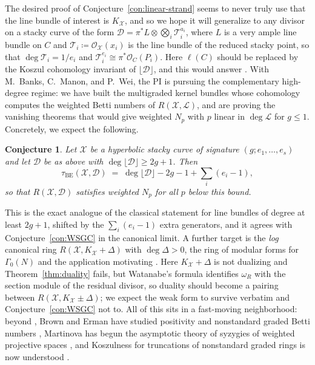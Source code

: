\documentclass[11pt,reqno]{amsart}
\newtheorem{conjecture}[lemma]{Conjecture}
\theoremstyle{remark}
\newcommand{\BE}{\operatorname{BE}}
\newcommand{\cD}{\mathcal{D}}
\newcommand{\cL}{\mathcal{L}}
\newcommand{\cO}{\mathcal{O}}
\newcommand{\cT}{\mathcal{T}}
\newcommand{\cX}{\mathcal{X}}
\begin{document}
The desired proof of Conjecture~\ref{con:linear-strand} seems to never truly use that the line bundle of interest is $K_{\cX}$, and so we hope it will generalize to any divisor on a stacky curve of the form $\cD=\pi^*L\otimes\bigotimes_i\cT_i^{a_i}$, where $L$ is a very ample line bundle on $C$ and $\cT_i\coloneqq\cO_{\cX}(x_i)$ is the line bundle of the reduced stacky point, so that $\deg\cT_i=1/e_i$ and $\cT_i^{e_i}\cong\pi^*\cO_C(P_i)$. Here $\ell(C)$ should be replaced by the Koszul cohomology invariant of $\lfloor\cD\rfloor$, and this would answer \cite[Question 7.6]{brownErman25}. With M.~Banks, C.~Manon, and P.~Wei, the PI is pursuing the complementary high-degree regime: we have built the multigraded kernel bundles whose cohomology computes the weighted Betti numbers of $R(\cX,\cL)$, and are proving the vanishing theorems that would give weighted $N_p$ with $p$ linear in $\deg\cL$ for $g\leq1$. Concretely, we expect the following.
 
\begin{conjecture}\label{conj:high-degree}
Let $\cX$ be a hyperbolic stacky curve of signature $(g;e_1,\ldots,e_s)$ and let $\cD$ be as above with $\deg\lfloor\cD\rfloor\geq2g+1$. Then
\[
	\tau_{\BE}(\cX,\cD)\;=\;\deg\lfloor\cD\rfloor-2g-1+\sum_i(e_i-1),
\]
so that $R(\cX,\cD)$ satisfies weighted $N_p$ for all $p$ below this bound.
\end{conjecture}
 
This is the exact analogue of the classical statement for line bundles of degree at least $2g+1$, shifted by the $\sum_i(e_i-1)$ extra generators, and it agrees with Conjecture~\ref{con:WSGC} in the canonical limit. A further target is the \emph{log} canonical ring $R(\cX,K_{\cX}+\Delta)$ with $\deg\Delta>0$, the ring of modular forms for $\Gamma_0(N)$ and the application motivating \cite{voightZurieckBrown22}. Here $K_{\cX}+\Delta$ is not dualizing and Theorem~\ref{thm:duality} fails, but Watanabe's formula identifies $\omega_R$ with the section module of the residual divisor, so duality should become a pairing between $R(\cX,K_{\cX}\pm\Delta)$; we expect the weak form to survive verbatim and Conjecture~\ref{con:WSGC} not to. All of this sits in a fast-moving neighborhood: beyond \cite{brownErman25,brownErmanStrands24,banksCobbSayrafi26}, Brown and Erman have studied positivity and nonstandard graded Betti numbers \cite{brownErman24-2}, Martinova has begun the asymptotic theory of syzygies of weighted projective spaces \cite{martinova25}, and Koszulness for truncations of nonstandard graded rings is now understood \cite{DB25}.
 
\end{document}
